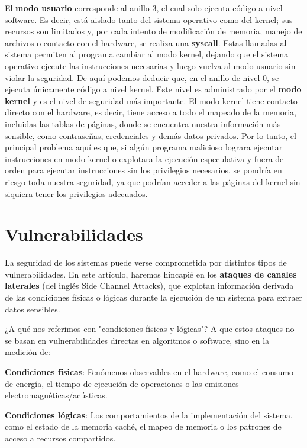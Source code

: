 \documentclass[lettersize,compsoc]{IEEEtran}
\begin{document}
El \textbf{modo usuario} corresponde al anillo 3, el cual solo ejecuta código a nivel software. Es decir, está aislado tanto del sistema operativo como del kernel; sus recursos son limitados y, por cada intento de modificación de memoria, manejo de archivos o contacto con el hardware, se realiza una \textbf{syscall}. Estas llamadas al sistema permiten al programa cambiar al modo kernel, dejando que el sistema operativo ejecute las instrucciones necesarias y luego vuelva al modo usuario sin violar la seguridad.
\newline
De aquí podemos deducir que, en el anillo de nivel 0, se ejecuta únicamente código a nivel kernel. Este nivel es administrado por el \textbf{modo kernel} y es el nivel de seguridad más importante. El modo kernel tiene contacto directo con el hardware, es decir, tiene acceso a todo el mapeado de la memoria, incluidas las tablas de páginas, donde se encuentra nuestra información más sensible, como contraseñas, credenciales y demás datos privados.
\newline
Por lo tanto, el principal problema aquí es que, si algún programa malicioso lograra ejecutar instrucciones en modo kernel o explotara la ejecución especulativa y fuera de orden para ejecutar instrucciones sin los privilegios necesarios, se pondría en riesgo toda nuestra seguridad, ya que podrían acceder a las páginas del kernel sin siquiera tener los privilegios adecuados.

\section{Vulnerabilidades}

La seguridad de los sistemas puede verse comprometida por distintos tipos de vulnerabilidades. En este artículo, haremos hincapié en los \textbf{ataques de canales laterales} \cite{Side Channel Attack} (del inglés Side Channel Attacks), que explotan información derivada de las condiciones físicas o lógicas durante la ejecución de un sistema para extraer datos sensibles.

¿A qué nos referimos con "condiciones físicas y lógicas"? A que estos ataques no se basan en vulnerabilidades directas en algoritmos o software, sino en la medición de:

    \textbf{Condiciones físicas}: Fenómenos observables en el hardware, como el consumo de energía, el tiempo de ejecución de operaciones o las emisiones electromagnéticas/acústicas.

    \textbf{Condiciones lógicas}: Los comportamientos de la implementación del sistema, como el estado de la memoria caché, el mapeo de memoria o los patrones de acceso a recursos compartidos.
\end{document}
